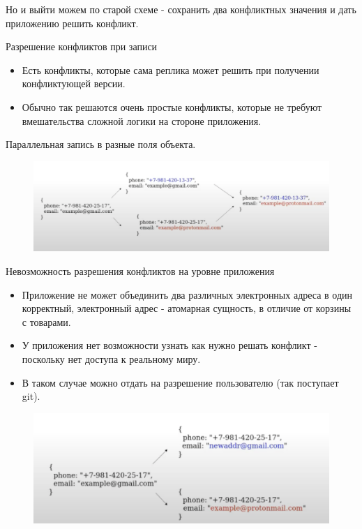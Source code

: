 Но и выйти можем по старой схеме - сохранить два конфликтных значения и дать приложению решить конфликт.
\begin{definition}
  Разрешение конфликтов при записи
\end{definition}
\begin{itemize}
  \item Есть конфликты, которые сама реплика может решить при получении конфликтующей версии.
  \item Обычно так решаются очень простые конфликты, которые не требуют вмешательства сложной логики на стороне приложения.
\end{itemize}
\begin{example}
  Параллельная запись в разные поля объекта.\\
  \begin{figure}[h]
      \centering
      \includegraphics[scale = 0.5]{../assets/7.png}
      \caption{}
  \end{figure}
\end{example}
\begin{definition}
  Невозможность разрешения конфликтов на уровне приложения
\end{definition}
\begin{itemize}
  \item Приложение не может объединить два различных электронных адреса в один корректный, электронный адрес - атомарная сущность, в отличие от корзины с товарами.
  \item У приложения нет возможности узнать как нужно решать конфликт - поскольку нет доступа к реальному миру.
  \item В таком случае можно отдать на разрешение пользователю (так поступает git).
\end{itemize}
\begin{figure}[h]
    \centering
    \includegraphics[scale = 0.5]{../assets/8.png}
    \caption{}
\end{figure}
